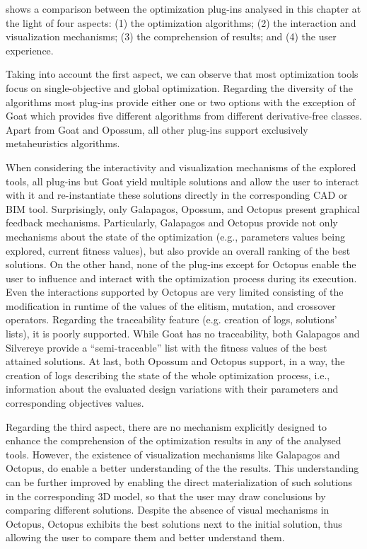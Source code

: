 	 shows a comparison between the optimization plug-ins analysed in this chapter at the light of four aspects: (1) the optimization algorithms; (2) the interaction and visualization mechanisms; (3) the comprehension of results; and (4) the user experience.
	
	Taking into account the first aspect, we can observe that most optimization tools focus on single-objective and global optimization. Regarding the diversity of the algorithms most plug-ins provide either one or two options with the exception of Goat which provides five different algorithms from different derivative-free classes. Apart from Goat and Opossum, all other plug-ins support exclusively metaheuristics algorithms.
	
	When considering the interactivity and visualization mechanisms of the explored tools, all plug-ins but Goat yield multiple solutions and allow the user to interact with it and re-instantiate these solutions directly in the corresponding \ac{CAD} or \ac{BIM} tool. Surprisingly, only Galapagos, Opossum, and Octopus present graphical feedback mechanisms. Particularly, Galapagos and Octopus provide not only mechanisms about the state of the optimization (e.g., parameters values being explored, current fitness values), but also provide an overall ranking of the best solutions. On the other hand, none of the plug-ins except for Octopus enable the user to influence and interact with the optimization process during its execution. Even the interactions supported by Octopus are very limited consisting of the modification in runtime of the values of the elitism, mutation, and crossover operators. Regarding the traceability feature (e.g. creation of logs, solutions' lists), it is poorly supported. While Goat has no traceability, both Galapagos and Silvereye provide a ``semi-traceable'' list with the fitness values of the best attained solutions. At last, both Opossum and Octopus support, in a way, the creation of logs describing the state of the whole optimization process, i.e., information about the evaluated design variations with their parameters and corresponding objectives values.
	
	Regarding the third aspect, there are no mechanism explicitly designed to enhance the comprehension of the optimization results in any of the analysed tools. However, the existence of visualization mechanisms like Galapagos and Octopus, do enable a better understanding of the the results. This understanding can be further improved by enabling the direct materialization of such solutions in the corresponding 3D model, so that the user may draw conclusions by comparing different solutions. Despite the absence of visual mechanisms in Octopus, Octopus exhibits the best solutions next to the initial solution, thus allowing the user to compare them and better understand them.
	
